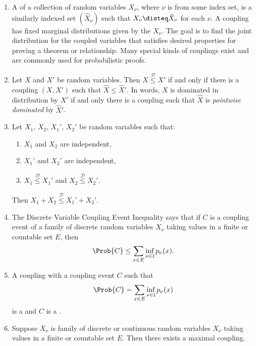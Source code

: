 \documentclass[12pt]{article}
\begin{document}
\begin{enumerate}
    \item
        A  of a collection of random variables \( X_\nu \),
        where \( \nu \) is from some index set, is a similarly indexed
        set \( (\hat{X}_\nu) \) such that \( X_{\nu} \disteq \hat{X}_{\nu}
        \) for each \( \nu \).  A coupling has fixed marginal
        distributions given by the \( X_\nu \).  The goal is to find the
        joint distribution for the coupled variables that satisfies
        desired properties for proving a theorem or relationship.  Many
        special kinds of couplings exist and are commonly used for
        probabilistic proofs.
    \item
        Let \( X \) and \( X' \) be random variables.  Then \( X
        \stackrel{\mathcal{D}}{\le} X' \) if and only if there is a
        coupling \( (X,X') \) such that \( \hat{X} \le \hat{X}' \).  In
        words, \( X \) is dominated in distribution by \( X' \) if and
        only there is a coupling such that \( \hat{X} \) is \emph{pointwise
        dominated} by \( \hat{X}' \).
    \item
        Let \( X_1 \), \( X_2 \), \( X_1' \), \( X_2' \) be random
        variables such that:
        \begin{enumerate}
            \item
                \( X_1 \) and \( X_2 \) are independent,
            \item
                \( X_1' \) and \( X_2' \) are independent,
            \item
                \( X_1\stackrel{\mathcal{D}}{\le} X_1' \) and \( X_2\stackrel
                {\mathcal{D}}{\le} X_2' \).
        \end{enumerate}
        Then \( X_1 + X_2 \stackrel{\mathcal{D}}{\le} X_1' + X_2' \).
    \item
        The Discrete Variable Coupling Event Inequality says that if \(
        C \) is a coupling event of a family of discrete random
        variables \( X_{\nu} \) taking values in a finite or countable
        set \( E \), then
        \[
            \Prob{C} \le \sum\limits_{x \in E} \inf_{\nu \in \mathbb{I}}
            p_\nu(x).
        \]
    \item
        A coupling with a coupling event \( C \) such that
        \[
            \Prob{C} = \sum\limits_{x \in E} \inf_{\nu \in \mathbb{I}} p_\nu
            (x)
        \] is a  and \( C \) is a .
    \item
        Suppose \( X_{\nu} \) is family of discrete or continuous random
        variables \( X_{\nu} \) taking values in a finite or countable
        set \( E \).  Then there exists a maximal coupling.


\end{enumerate}
\end{document}
